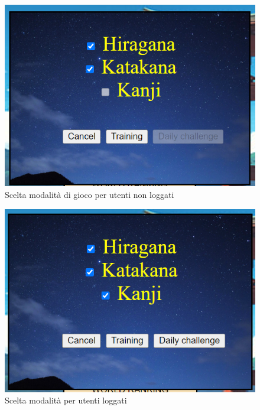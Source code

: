 \begin{figure}[!h]
\centering
\includegraphics[scale=0.80]{images/sceltaAlfabetoUnlogged.png}
\caption{Scelta modalità di gioco per utenti non loggati}
\label{fig:user_flow_guest}
\end{figure}
\noindent

\begin{figure}[!h]
\centering
\includegraphics[scale=0.80]{images/sceltaAlfabetoLogged.png}
\caption{Scelta modalità per utenti loggati}
\label{fig:user_flow_guest}
\end{figure}
\noindent


